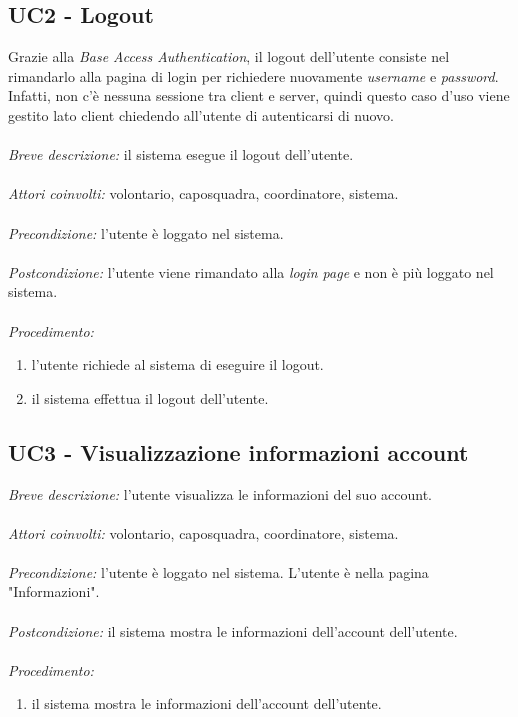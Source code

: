 \subsection{UC2 - Logout}
Grazie alla \textit{Base Access Authentication}, il logout dell'utente consiste nel rimandarlo alla pagina di login per richiedere nuovamente \textit{username} e \textit{password}. Infatti, non c'è nessuna sessione tra client e server, quindi questo caso d'uso viene gestito lato client chiedendo all'utente di autenticarsi di nuovo.
\\
\\ 
\textit{Breve descrizione:} il sistema esegue il logout dell'utente.
\\
\\
\textit{Attori coinvolti:} volontario, caposquadra, coordinatore, sistema.
\\
\\
\textit{Precondizione:} l'utente è loggato nel sistema.
\\
\\
\textit{Postcondizione:} l'utente viene rimandato alla \textit{login page} e non è più loggato nel sistema.
\\
\\
\textit{Procedimento:}
\begin{enumerate}
	\item l'utente richiede al sistema di eseguire il logout.
	\item il sistema effettua il logout dell'utente.
\end{enumerate}

\subsection{UC3 - Visualizzazione informazioni account}
\textit{Breve descrizione:} l'utente visualizza le informazioni del suo account.
\\
\\
\textit{Attori coinvolti:} volontario, caposquadra, coordinatore, sistema. 
\\
\\
\textit{Precondizione:} l'utente è loggato nel sistema. L'utente è nella pagina "Informazioni".
\\
\\
\textit{Postcondizione:} il sistema mostra le informazioni dell'account dell'utente.
\\
\\
\textit{Procedimento:}
\begin{enumerate}
	\item il sistema mostra le informazioni dell'account dell'utente.
\end{enumerate}


